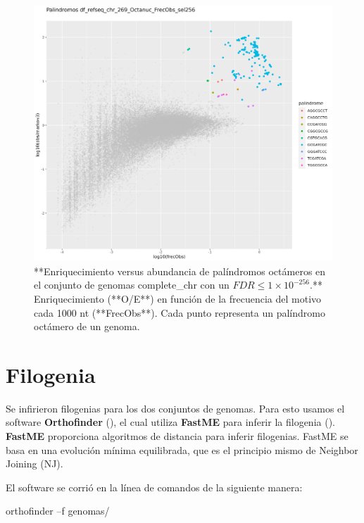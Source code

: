 \documentclass[
]{book}
\newenvironment{Shaded}{\begin{snugshade}}{\end{snugshade}}
\newcommand{\ExtensionTok}[1]{#1}
\newcommand{\NormalTok}[1]{#1}
\begin{document}
\begin{figure}

{\centering \includegraphics[width=0.8\linewidth]{figures/df_refseq_chr_269_Octanuc_FrecObs_sel256_significative-palindromes} 

}

\caption{**Enriquecimiento versus abundancia de palíndromos octámeros en el conjunto de genomas complete\_chr con un $FDR \leq 1 \times 10^{-256}$.** Enriquecimiento (**O/E**) en función de la frecuencia del motivo cada 1000 nt (**FrecObs**). Cada punto representa un palíndromo octámero de un genoma.}\label{fig:FIG2}
\end{figure}

\hypertarget{filogenia}{%
\section{Filogenia}\label{filogenia}}

Se infirieron filogenias para los dos conjuntos de genomas. Para esto usamos el software \textbf{Orthofinder} (\citet{emms2019orthofinder}), el cual utiliza \textbf{FastME} para inferir la filogenia (\citet{lefort2015fastme}). \textbf{FastME} proporciona algoritmos de distancia para inferir filogenias. FastME se basa en una evolución mínima equilibrada, que es el principio mismo de Neighbor Joining (NJ).

El software se corrió en la línea de comandos de la siguiente manera:

\begin{Shaded}
\begin{Highlighting}[]
\ExtensionTok{orthofinder}\NormalTok{ –f genomas/ }
\end{Highlighting}
\end{Shaded}
\end{document}
